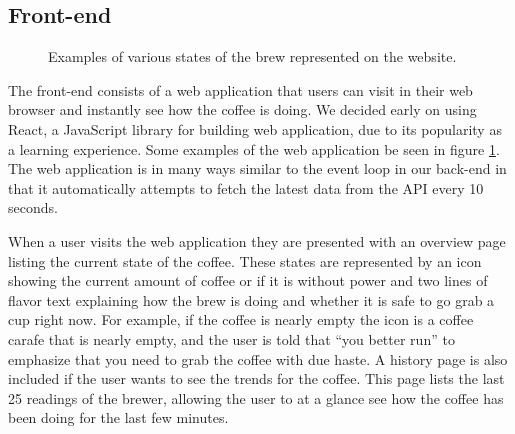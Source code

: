 \documentclass[12pt,a4paper,oneside,article]{memoir}
\numberwithin{equation}{chapter}
\begin{document}
\subsection{Front-end}\label{sec:front-end}
\begin{figure}[ht]
  \centerfloat{}
  \caption{Examples of various states of the brew represented on the website.}\label{fig:website}
\end{figure}
The front-end consists of a web application that users can visit in their web
browser and instantly see how the coffee is doing. We decided early on using
React, a JavaScript library for building web application, due to its popularity
as a learning experience. Some examples of the web application be seen in figure
\ref{fig:website}. The web application is in many ways similar to the event loop
in our back-end in that it automatically attempts to fetch the latest data from
the API every 10 seconds.

When a user visits the web application they are presented with an overview page
listing the current state of the coffee. These states are represented by an icon
showing the current amount of coffee or if it is without power and two lines of
flavor text explaining how the brew is doing and whether it is safe to go grab a
cup right now. For example, if the coffee is nearly empty the icon is a coffee
carafe that is nearly empty, and the user is told that ``you better run'' to
emphasize that you need to grab the coffee with due haste. A history page is
also included if the user wants to see the trends for the coffee. This page
lists the last 25 readings of the brewer, allowing the user to at a glance see
how the coffee has been doing for the last few minutes.
\end{document}
